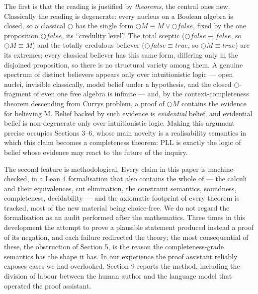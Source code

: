 The first is that the reading is justified by \emph{theorems}, the central
ones new. Classically the reading is degenerate: every nucleus on a
Boolean algebra is closed, so a classical \ensuremath{\bigcirc} has the single form
\ensuremath{\bigcirc M \equiv M \vee \bigcirc\mathit{false}}, fixed by the one
proposition \ensuremath{\bigcirc\mathit{false}}, its ``credulity level''. The total
sceptic (\ensuremath{\bigcirc\mathit{false} \equiv \mathit{false}}, so
\ensuremath{\bigcirc M \equiv M}) and the totally credulous believer
(\ensuremath{\bigcirc\mathit{false} \equiv \mathit{true}}, so
\ensuremath{\bigcirc M \equiv \mathit{true}}) are its extremes; every classical
believer has this same form, differing only in the disjoined proposition, so
there is no structural variety among them. A genuine spectrum of distinct
believers appears only over intuitionistic logic ---
open nuclei, invisible classically, model belief under a hypothesis,
and the closed \ensuremath{\bigcirc}-fragment of even one free algebra is infinite --- and,
by the context-completeness theorem descending from Curry\textquotesingle s problem, a
proof of \ensuremath{\bigcirc M} contains the evidence for believing M. Belief
backed by such evidence is \emph{evidential} belief, and evidential belief is
non-degenerate only over intuitionistic logic. Making this argument
precise occupies Sections 3--6, whose main novelty is a realisability
semantics in which this claim becomes a completeness theorem: PLL is
exactly the logic of belief whose evidence may react to the future of
the inquiry.

The second feature is methodological. Every claim in this paper is
machine-checked, in a Lean 4 formalisation that also contains the whole
of \cite{FairtloughMendler1997} --- the calculi and their equivalences, cut elimination,
the constraint semantics, soundness, completeness, decidability --- and
the axiomatic footprint of every theorem is tracked, most of the new
material being choice-free. We do not regard the formalisation as an
audit performed after the mathematics. Three times in this development
the attempt to prove a plausible statement produced instead a proof of
its negation, and each failure redirected the theory; the most
consequential of these, the obstruction of Section 5, is the reason the
completeness-grade semantics has the shape it has. In our experience the
proof assistant reliably exposes cases we had overlooked. Section 9
reports the method, including the
division of labour between the human author and the language model that
operated the proof assistant.

